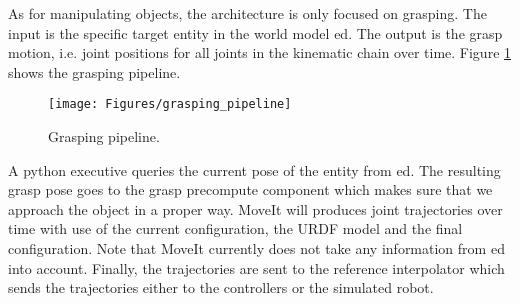 As for manipulating objects, the architecture is only focused on grasping. The input is the specific target entity in the world model \acrshort{ed}. The output is the grasp motion, i.e. joint positions for all joints in the kinematic chain over time. Figure \ref{fig:grasping_pipeline} shows the grasping pipeline.
\begin{figure}[h]
    \centering
	\texttt{[image: Figures/grasping\_pipeline]}
	\caption{Grasping pipeline.}
	\label{fig:grasping_pipeline}
\end{figure}
A python executive queries the current pose of the entity from \acrshort{ed}. The resulting grasp pose goes to the grasp precompute component which makes sure that we approach the object in a proper way. MoveIt will produces joint trajectories over time with use of the current configuration, the URDF model and the final configuration. Note that MoveIt currently does not take any information from \acrshort{ed} into account. Finally, the trajectories are sent to the reference interpolator which sends the trajectories either to the controllers or the simulated robot. 